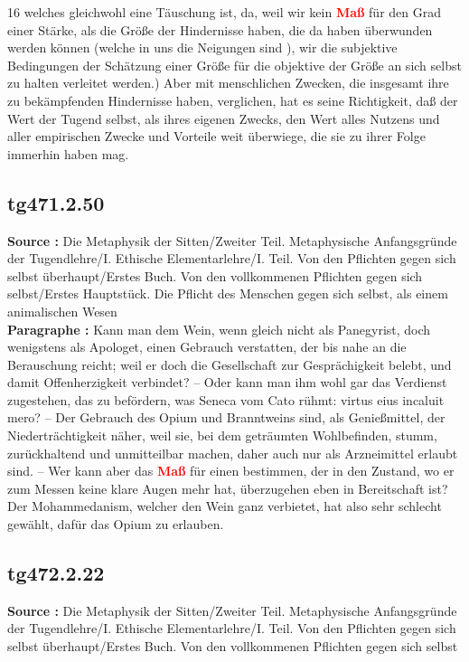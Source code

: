 \documentclass[a4paper,12pt,twoside]{book}
\newcommand{\match}[1]{\textcolor{red}{\textbf{#1}}}
\begin{document}
	
	16
	welches gleichwohl eine Täuschung ist, da, weil wir kein \match{Maß} für den Grad einer Stärke, als die Größe der Hindernisse haben, die da haben überwunden werden können (welche in uns die Neigungen sind ), wir die subjektive Bedingungen der Schätzung einer Größe für die objektive der Größe an sich selbst zu halten verleitet werden.) Aber mit menschlichen Zwecken, die insgesamt ihre zu bekämpfenden Hindernisse haben, verglichen, hat es seine Richtigkeit, daß der Wert der Tugend selbst, als ihres eigenen Zwecks, den Wert alles Nutzens und aller empirischen Zwecke und Vorteile weit überwiege, die sie zu ihrer Folge immerhin haben mag. 
	
	\subsection*{tg471.2.50} 
	\textbf{Source : }Die Metaphysik der Sitten/Zweiter Teil. Metaphysische Anfangsgründe der Tugendlehre/I. Ethische Elementarlehre/I. Teil. Von den Pflichten gegen sich selbst überhaupt/Erstes Buch. Von den vollkommenen Pflichten gegen sich selbst/Erstes Hauptstück. Die Pflicht des Menschen gegen sich selbst, als einem animalischen Wesen\\  
	
	\textbf{Paragraphe : }Kann man dem Wein, wenn gleich nicht als Panegyrist, doch wenigstens als Apologet, einen Gebrauch verstatten, der bis nahe an die Berauschung reicht; weil er doch die Gesellschaft zur Gesprächigkeit belebt, und damit Offenherzigkeit verbindet? – Oder kann man ihm wohl gar das Verdienst zugestehen, das zu befördern, was Seneca vom Cato rühmt: virtus eius incaluit mero? – Der Gebrauch des Opium und Branntweins sind, als Genießmittel, der Niederträchtigkeit näher, weil sie, bei dem geträumten Wohlbefinden, stumm, zurückhaltend und unmitteilbar machen, daher auch nur als Arzneimittel erlaubt sind. – Wer kann aber das \match{Maß} für einen bestimmen, der in den Zustand, wo er zum Messen keine klare Augen mehr hat, überzugehen eben in Bereitschaft ist? Der Mohammedanism, welcher den Wein ganz verbietet, hat also sehr schlecht gewählt, dafür das Opium zu erlauben. 
	
	\subsection*{tg472.2.22} 
	\textbf{Source : }Die Metaphysik der Sitten/Zweiter Teil. Metaphysische Anfangsgründe der Tugendlehre/I. Ethische Elementarlehre/I. Teil. Von den Pflichten gegen sich selbst überhaupt/Erstes Buch. Von den vollkommenen Pflichten gegen sich selbst\\  
	
\end{document}
